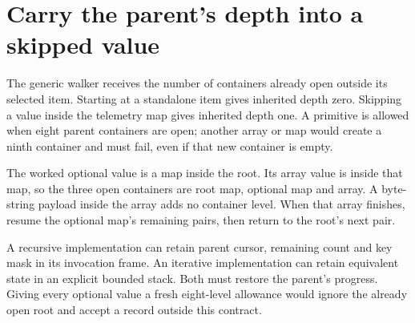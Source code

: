 \section{Carry the parent's depth into a skipped value}
The generic walker receives the number of containers already open outside its selected
item. Starting at a standalone item gives inherited depth zero. Skipping a value inside
the telemetry map gives inherited depth one. A primitive is allowed when eight parent
containers are open; another array or map would create a ninth container and must fail,
even if that new container is empty.

The worked optional value is a map inside the root. Its array value is inside that map,
so the three open containers are root map, optional map and array. A byte-string payload
inside the array adds no container level. When that array finishes, resume the optional
map's remaining pairs, then return to the root's next pair.

A recursive implementation can retain parent cursor, remaining count and key mask in
its invocation frame. An iterative implementation can retain equivalent state in an
explicit bounded stack. Both must restore the parent's progress. Giving every optional
value a fresh eight-level allowance would ignore the already open root and accept a
record outside this contract.
